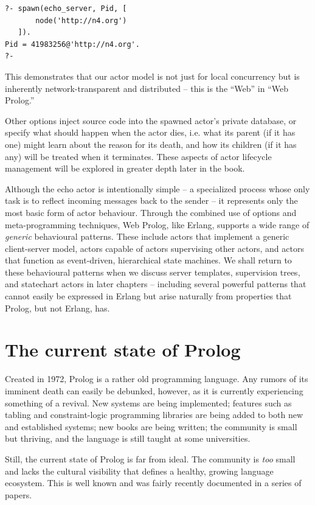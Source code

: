 \begin{verbatim}
?- spawn(echo_server, Pid, [
       node('http://n4.org')
   ]).
Pid = 41983256@'http://n4.org'.
?- 
\end{verbatim}

\noindent This demonstrates that our actor model is not just for local concurrency but is inherently network-transparent and distributed -- this is the ``Web'' in ``Web Prolog.''

Other options inject source code into the spawned actor's private database, or specify what should happen when the actor dies, i.e. what its parent (if it has one) might learn about the reason for its death, and how its children (if it has any) will be treated when it terminates. These aspects of actor lifecycle management will be explored in greater depth later in the book.

Although the echo actor is intentionally simple -- a specialized process whose only task is to reflect incoming messages back to the sender -- it represents only the most basic form of actor behaviour. Through the combined use of options and meta-programming techniques, Web Prolog, like Erlang, supports a wide range of \textit{generic} behavioural patterns. These include actors that implement a generic client-server model, actors capable of actors supervising other actors, and actors that function as event-driven, hierarchical state machines. We shall return to these behavioural patterns when we discuss server templates, supervision trees, and statechart actors in later chapters -- including several powerful patterns that cannot easily be expressed in Erlang but arise naturally from properties that Prolog, but not Erlang, has.

\section{The current state of Prolog}

Created in 1972, Prolog is a rather old programming language. Any rumors of its imminent death can easily be debunked, however, as it is currently experiencing something of a revival. New systems are being implemented; features such as tabling and constraint-logic programming libraries are being added to both new and established systems; new books are being written; the community is small but thriving, and the language is still taught at some universities.

Still, the current state of Prolog is far from ideal. The community is \textit{too} small and lacks the cultural visibility that defines a healthy, growing language ecosystem. This is well known and was fairly recently documented in a series of papers.

